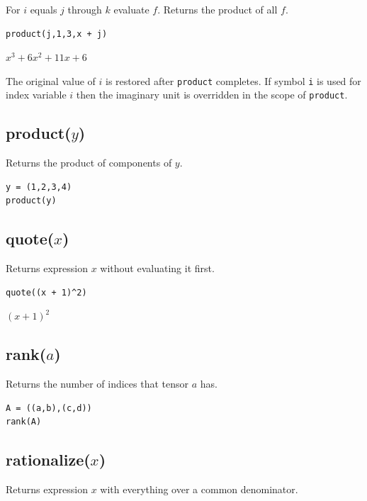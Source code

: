 \documentclass[12pt]{article}
\begin{document}
For $i$ equals $j$ through $k$ evaluate $f$.
Returns the product of all $f$.

{\color{blue}
\begin{verbatim}
product(j,1,3,x + j)
\end{verbatim}
}

\noindent
$\displaystyle x^3+6x^2+11x+6$

\bigskip
\noindent
The original value of $i$ is restored after {\tt product} completes.
If symbol {\tt i} is used for index variable $i$
then the imaginary unit is overridden in the scope of {\tt product}.

\subsection*{product($y$)}

Returns the product of components of $y$.

{\color{blue}
\begin{verbatim}
y = (1,2,3,4)
product(y)
\end{verbatim}
}


\subsection*{quote($x$)}

Returns expression $x$ without evaluating it first.

{\color{blue}
\begin{verbatim}
quote((x + 1)^2)
\end{verbatim}
}

\noindent
$\displaystyle (x+1)^2$

\subsection*{rank($a$)}

Returns the number of indices that tensor $a$ has.

{\color{blue}
\begin{verbatim}
A = ((a,b),(c,d))
rank(A)
\end{verbatim}
}


\subsection*{rationalize($x$)}

Returns expression $x$ with everything over a common denominator.
\end{document}
